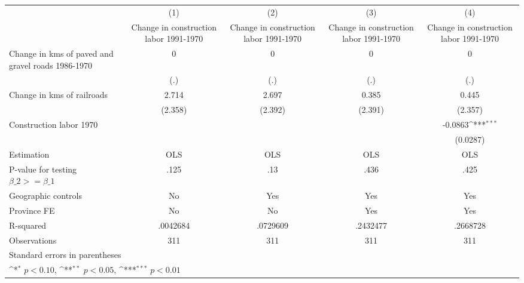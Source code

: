 {
\def\sym#1{\ifmmode^{#1}\else\(^{#1}\)\fi}
\begin{tabular}{l*{4}{c}}
\hline\hline
                    &\multicolumn{1}{c}{(1)}&\multicolumn{1}{c}{(2)}&\multicolumn{1}{c}{(3)}&\multicolumn{1}{c}{(4)}\\
                    &\multicolumn{1}{c}{Change in construction labor 1991-1970}&\multicolumn{1}{c}{Change in construction labor 1991-1970}&\multicolumn{1}{c}{Change in construction labor 1991-1970}&\multicolumn{1}{c}{Change in construction labor 1991-1970}\\
\hline
Change in kms of paved and gravel roads 1986-1970&           0         &           0         &           0         &           0         \\
                    &         (.)         &         (.)         &         (.)         &         (.)         \\
[1em]
Change in kms of railroads&       2.714         &       2.697         &       0.385         &       0.445         \\
                    &     (2.358)         &     (2.392)         &     (2.391)         &     (2.357)         \\
[1em]
Construction labor 1970&                     &                     &                     &     -0.0863\sym{***}\\
                    &                     &                     &                     &    (0.0287)         \\
\hline
Estimation          &         OLS         &         OLS         &         OLS         &         OLS         \\
P-value for testing $\beta\_2 >= \beta\_1$&        .125         &         .13         &        .436         &        .425         \\
Geographic controls &          No         &         Yes         &         Yes         &         Yes         \\
Province FE         &          No         &          No         &         Yes         &         Yes         \\
R-squared           &    .0042684         &    .0729609         &    .2432477         &    .2668728         \\
Observations        &         311         &         311         &         311         &         311         \\
\hline\hline
\multicolumn{5}{l}{\footnotesize Standard errors in parentheses}\\
\multicolumn{5}{l}{\footnotesize \sym{*} \(p<0.10\), \sym{**} \(p<0.05\), \sym{***} \(p<0.01\)}\\
\end{tabular}
}
